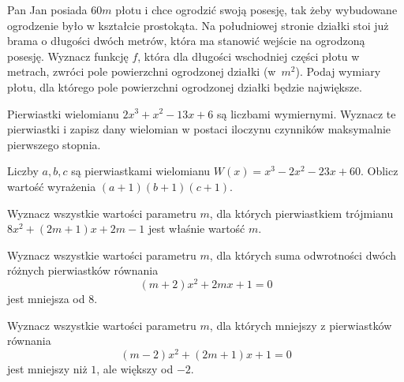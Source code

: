 \zadanie Pan Jan posiada $60m$ płotu i chce ogrodzić swoją posesję, tak żeby wybudowane ogrodzenie było w kształcie prostokąta. Na południowej stronie działki stoi już brama o długości dwóch metrów, która ma stanowić wejście na ogrodzoną posesję. Wyznacz funkcję $f$, która dla długości wschodniej części płotu w metrach, zwróci pole powierzchni ogrodzonej działki (w~$m^2$). Podaj wymiary płotu, dla którego pole powierzchni ogrodzonej działki będzie największe. %

\zadanie Pierwiastki wielomianu $2x^3 + x^2 - 13x + 6$ są liczbami wymiernymi. Wyznacz te pierwiastki i zapisz dany wielomian w postaci iloczynu czynników maksymalnie pierwszego stopnia. %

\zadanie Liczby $a, b, c$ są pierwiastkami wielomianu $W(x) = x^3 - 2x^2 - 23x + 60$. Oblicz wartość wyrażenia $(a + 1)(b + 1)(c + 1)$. %

\zadanie Wyznacz wszystkie wartości parametru $m$, dla których pierwiastkiem trójmianu $8x^2+(2m+1)x+2m-1$ jest właśnie wartość $m$. %

\zadanie Wyznacz wszystkie wartości parametru $m$, dla których suma odwrotności dwóch różnych pierwiastków równania \[ {(m+2)x^2+2mx+1=0} \] jest mniejsza od $8$.

\zadanie Wyznacz wszystkie wartości parametru $m$, dla których mniejszy z pierwiastków równania \[ (m-2)x^2+(2m+1)x+1=0 \] jest mniejszy niż $1$, ale większy od $-2$.